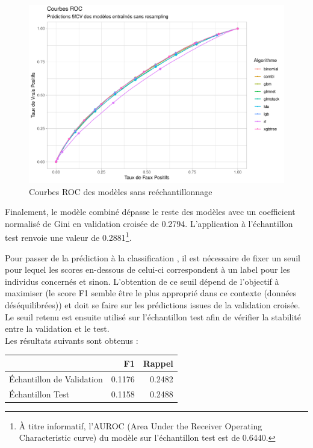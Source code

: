 \documentclass[french]{article}
\begin{document}
\begin{multicols}{2}
\begin{figure}[H] \centering
  \includegraphics[width = \columnwidth]{img/roc_curves}
  \caption{Courbes ROC des modèles sans reéchantillonnage}
\end{figure}
Finalement, le modèle combiné dépasse le reste des modèles avec un coefficient normalisé de Gini en validation croisée de 0.2794. L'application à l'échantillon test renvoie une valeur de 0.2881\footnote{À titre informatif, l'AUROC (Area Under the Receiver Operating Characteristic curve) du modèle sur l'échantillon test est de 0.6440.}.

Pour passer de la prédiction à la classification \cite{fhar}, il est nécessaire de fixer un seuil pour lequel les scores en-dessous de celui-ci correspondent à un label   \fg{} pour les individus concernés et  \fg{} sinon. L'obtention de ce seuil dépend de l'objectif à maximiser (le score F1 semble être le plus approprié dans ce contexte (données déséquilibrées)) et doit se faire sur les prédictions issues de la validation croisée. Le seuil retenu est ensuite utilisé sur l'échantillon test afin de vérifier la stabilité entre la validation et le test.\\
Les résultats suivants sont obtenus :

\begin{center}\begin{tabular}{|l|r|r|} \hline
  & F1 & Rappel \\ \hline
  Échantillon de Validation & 0.1176 & 0.2482 \\
  Échantillon Test & 0.1158 & 0.2488 \\ \hline
\end{tabular}\end{center}


\end{multicols}
\end{document}
